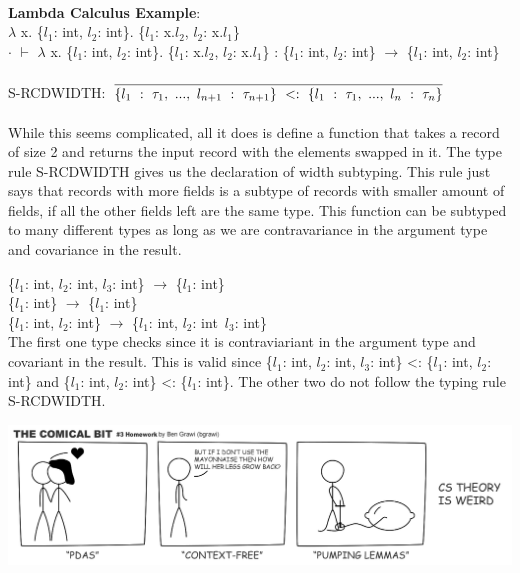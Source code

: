 \documentclass[9pt]{extarticle} %
\newcommand{\cmark}{\ding{51}}%
\newcommand{\xmark}{\ding{55}}%
\begin{document}
\begin{minipage}[t]{.61\linewidth}
\\
\textbf{Lambda Calculus Example}: \\
$\lambda$ x. \{$l_1$: int, $l_2$: int\}. \{$l_1$: x.$l_2$, $l_2$: x.$l_1$\} \\
$\cdot$ $\vdash$ $\lambda$ x. \{$l_1$: int, $l_2$: int\}. \{$l_1$: x.$l_2$, $l_2$: x.$l_1$\} : \{$l_1$: int, $l_2$: int\} $\rightarrow$ \{$l_1$: int, $l_2$: int\}  \\
\\
S-RCDWIDTH: 
$\infer{\{l_1\ :\ \tau_1,\ ...,\ l_{n+1}\ :\ \tau_{n+1}\}\ <:\ \{l_1\ :\ \tau_1,\ ...,\ l_n\ :\ \tau_n\}}{}$ \\
\\
While this seems complicated, all it does is define a function that takes a record
of size 2 and returns the input record with the elements swapped in it. The type 
rule S-RCDWIDTH gives us the declaration of width subtyping. This rule just says
that records with more fields is a subtype of records with smaller amount of fields,
if all the other fields left are the same type. This function can be subtyped to 
many different types as long as we are contravariance in the argument type and covariance in the result. 

\cmark \{$l_1$: int, $l_2$: int, $l_3$: int\} $\rightarrow$ \{$l_1$: int\} \\
\xmark \{$l_1$: int\} $\rightarrow$ \{$l_1$: int\} \\
\xmark \{$l_1$: int, $l_2$: int\} $\rightarrow$ \{$l_1$: int, $l_2$: int\, $l_3$: int\}  \\
The first one type checks since it is contraviariant in the argument type and
covariant in the result. This is valid since
\{$l_1$: int, $l_2$: int, $l_3$: int\} <: \{$l_1$: int, $l_2$: int\} and 
\{$l_1$: int, $l_2$: int\} <: \{$l_1$: int\}. The other two do not follow the
typing rule S-RCDWIDTH. 

\includegraphics[width=\linewidth]{cstheory.png} 
\end{minipage} %
\end{document}

